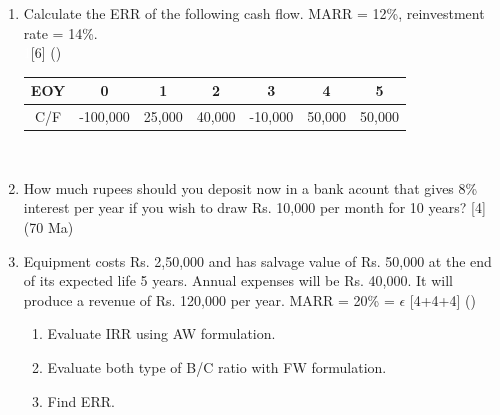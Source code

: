 \documentclass[12pt]{article}
\newcommand{\enter}{\\\textcolor{white}{1}}
\begin{document}
\begin{enumerate}[noitemsep, topsep = 0pt]
	\item Calculate the ERR of the following cash flow. MARR = 12\%, reinvestment rate = 14\%.
	\enter\hfill [6] ()\\
	\begin{tabular}{|c|c|c|c|c|c|c|}
		\hline
		EOY & 0 & 1 & 2 & 3 & 4 & 5\\ \hline
		C/F & -100,000 & 25,000 & 40,000 & -10,000 & 50,000 & 50,000 \\ \hline
	\end{tabular}\\[0pt]
	
	\item How much rupees should you deposit now in a bank acount that gives 8\% interest per year if you wish to draw Rs. 10,000 per month for 10 years? \hfill [4] (70 Ma)
	
	\item Equipment costs Rs. 2,50,000 and has salvage value of Rs. 50,000 at the end of its expected life 5 years. Annual expenses will be Rs. 40,000. It will produce a revenue of Rs. 120,000 per year. MARR = 20\% = $\epsilon$ \hfill [4+4+4] ()
	\begin{enumerate}[noitemsep, topsep = 0pt, label = \alph*.]
		\item Evaluate IRR using AW formulation.
		\item Evaluate both type of B/C ratio with FW formulation.
		\item Find ERR.
	\end{enumerate}
\end{enumerate}
\end{document}
